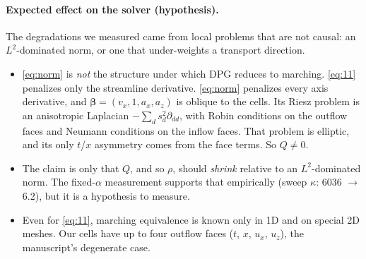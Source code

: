 \documentclass[11pt]{article}
\theoremstyle{remark}
\newcommand{\bbeta}{\boldsymbol{\beta}}
\begin{document}
\paragraph{Expected effect on the solver (hypothesis).}  The degradations we measured came from local problems that
are not causal: an $L^2$-dominated norm, or one that under-weights a transport direction.
\begin{itemize}[nosep]
  \item \eqref{eq:norm} is \emph{not} the structure under which DPG reduces to marching.  \eqref{eq:11} penalizes only
        the streamline derivative.  \eqref{eq:norm} penalizes every axis derivative, and $\bbeta=(v_x,1,a_x,a_z)$ is
        oblique to the cells.  Its Riesz problem is an anisotropic Laplacian $-\sum_ds_d^2\partial_{dd}$, with Robin
        conditions on the outflow faces and Neumann conditions on the inflow faces.  That problem is elliptic, and its
        only $t$/$x$ asymmetry comes from the face terms.  So $Q\ne0$.
  \item The claim is only that $Q$, and so $\rho$, should \emph{shrink} relative to an $L^2$-dominated norm.  The
        fixed-$\alpha$ measurement supports that empirically (sweep $\kappa$: 6036 $\to$ 6.2), but it is a
        hypothesis to measure.
  \item Even for \eqref{eq:11}, marching equivalence is known only in 1D and on special 2D meshes.  Our cells have up
        to four outflow faces ($t$, $x$, $u_x$, $u_z$), the manuscript's degenerate case.
\end{itemize}
\end{document}
